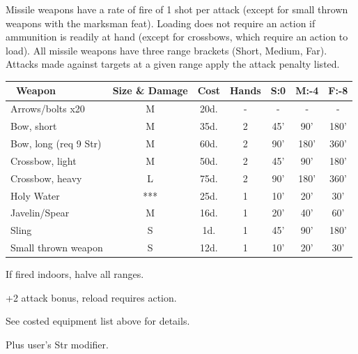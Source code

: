 \documentclass{book}
\begin{document}
Missile weapons have a rate of fire of 1 shot per attack (except for
small thrown weapons with the marksman feat). Loading does not require
an action if ammunition is readily at hand (except for crossbows, which
require an action to load). All missile weapons have three range
brackets (Short, Medium, Far). Attacks made against targets at a given
range apply the attack penalty listed.

\begin{table}[ht]
\centering
    \begin{threeparttable}[b]
        \begin{tabular}{lcccccc}
            \toprule\
                Weapon &  Size \& Damage & Cost & Hands
                & S:0 & M:-4 & F:-8 \\
            \midrule
                Arrows/bolts x20 & M & 20d. & - & - & - & - \\
                Bow, short\tnote{*} & M & 35d. & 2 & 45' & 90' & 180' \\
                Bow, long\tnote{*} (req 9 Str) & M & 60d. & 2 & 90' & 180' & 360' \\
                Crossbow, light\tnote{**} & M & 50d. & 2 & 45' & 90' & 180' \\
                Crossbow, heavy\tnote{**} & L & 75d. & 2 & 90' & 180' & 360' \\
                Holy Water & *** & 25d. & 1 & 10' & 20' & 30' \\
                Javelin/Spear & M\tnote{†} & 16d. & 1 & 20' & 40' & 60' \\
                Sling & S & 1d. & 1 & 45' & 90' & 180' \\
                Small thrown weapon & S\tnote{†} & 12d. & 1 & 10' & 20' & 30' \\
            \bottomrule
        \end{tabular}
        \begin{tablenotes}
           \item [*] \footnotesize {If fired indoors, halve all ranges.}
           \item [**] \footnotesize {+2 attack bonus, reload requires action.}
           \item [***] \footnotesize {See costed equipment list above for details.}
           \item [†] \footnotesize {Plus user's Str modifier.}
        \end{tablenotes}
    \end{threeparttable}
\end{table}
\end{document}
